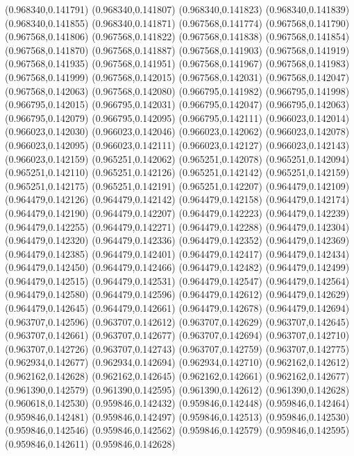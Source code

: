 (0.968340,0.141791)
(0.968340,0.141807)
(0.968340,0.141823)
(0.968340,0.141839)
(0.968340,0.141855)
(0.968340,0.141871)
(0.967568,0.141774)
(0.967568,0.141790)
(0.967568,0.141806)
(0.967568,0.141822)
(0.967568,0.141838)
(0.967568,0.141854)
(0.967568,0.141870)
(0.967568,0.141887)
(0.967568,0.141903)
(0.967568,0.141919)
(0.967568,0.141935)
(0.967568,0.141951)
(0.967568,0.141967)
(0.967568,0.141983)
(0.967568,0.141999)
(0.967568,0.142015)
(0.967568,0.142031)
(0.967568,0.142047)
(0.967568,0.142063)
(0.967568,0.142080)
(0.966795,0.141982)
(0.966795,0.141998)
(0.966795,0.142015)
(0.966795,0.142031)
(0.966795,0.142047)
(0.966795,0.142063)
(0.966795,0.142079)
(0.966795,0.142095)
(0.966795,0.142111)
(0.966023,0.142014)
(0.966023,0.142030)
(0.966023,0.142046)
(0.966023,0.142062)
(0.966023,0.142078)
(0.966023,0.142095)
(0.966023,0.142111)
(0.966023,0.142127)
(0.966023,0.142143)
(0.966023,0.142159)
(0.965251,0.142062)
(0.965251,0.142078)
(0.965251,0.142094)
(0.965251,0.142110)
(0.965251,0.142126)
(0.965251,0.142142)
(0.965251,0.142159)
(0.965251,0.142175)
(0.965251,0.142191)
(0.965251,0.142207)
(0.964479,0.142109)
(0.964479,0.142126)
(0.964479,0.142142)
(0.964479,0.142158)
(0.964479,0.142174)
(0.964479,0.142190)
(0.964479,0.142207)
(0.964479,0.142223)
(0.964479,0.142239)
(0.964479,0.142255)
(0.964479,0.142271)
(0.964479,0.142288)
(0.964479,0.142304)
(0.964479,0.142320)
(0.964479,0.142336)
(0.964479,0.142352)
(0.964479,0.142369)
(0.964479,0.142385)
(0.964479,0.142401)
(0.964479,0.142417)
(0.964479,0.142434)
(0.964479,0.142450)
(0.964479,0.142466)
(0.964479,0.142482)
(0.964479,0.142499)
(0.964479,0.142515)
(0.964479,0.142531)
(0.964479,0.142547)
(0.964479,0.142564)
(0.964479,0.142580)
(0.964479,0.142596)
(0.964479,0.142612)
(0.964479,0.142629)
(0.964479,0.142645)
(0.964479,0.142661)
(0.964479,0.142678)
(0.964479,0.142694)
(0.963707,0.142596)
(0.963707,0.142612)
(0.963707,0.142629)
(0.963707,0.142645)
(0.963707,0.142661)
(0.963707,0.142677)
(0.963707,0.142694)
(0.963707,0.142710)
(0.963707,0.142726)
(0.963707,0.142743)
(0.963707,0.142759)
(0.963707,0.142775)
(0.962934,0.142677)
(0.962934,0.142694)
(0.962934,0.142710)
(0.962162,0.142612)
(0.962162,0.142628)
(0.962162,0.142645)
(0.962162,0.142661)
(0.962162,0.142677)
(0.961390,0.142579)
(0.961390,0.142595)
(0.961390,0.142612)
(0.961390,0.142628)
(0.960618,0.142530)
(0.959846,0.142432)
(0.959846,0.142448)
(0.959846,0.142464)
(0.959846,0.142481)
(0.959846,0.142497)
(0.959846,0.142513)
(0.959846,0.142530)
(0.959846,0.142546)
(0.959846,0.142562)
(0.959846,0.142579)
(0.959846,0.142595)
(0.959846,0.142611)
(0.959846,0.142628)
